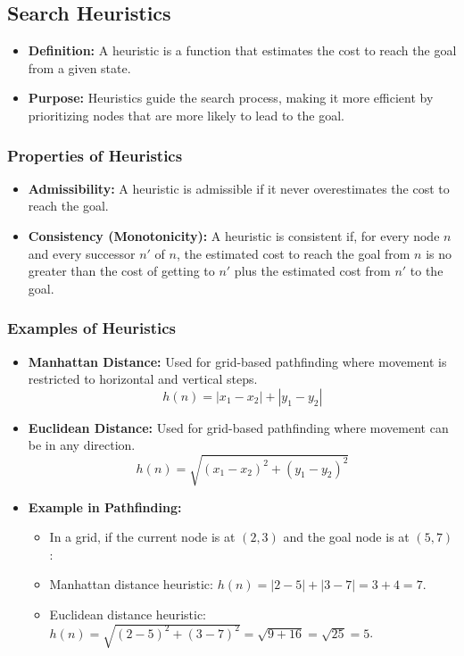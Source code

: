 \documentclass[8pt]{article}
\begin{document}
\subsection{Search Heuristics}
\begin{itemize}
    \item \textbf{Definition:} A heuristic is a function that estimates the cost to reach the goal from a given state.
    \item \textbf{Purpose:} Heuristics guide the search process, making it more efficient by prioritizing nodes that are more likely to lead to the goal.
\end{itemize}

\subsubsection*{Properties of Heuristics}
\begin{itemize}
    \item \textbf{Admissibility:} A heuristic is admissible if it never overestimates the cost to reach the goal.
    \item \textbf{Consistency (Monotonicity):} A heuristic is consistent if, for every node \(n\) and every successor \(n'\) of \(n\), the estimated cost to reach the goal from \(n\) is no greater than the cost of getting to \(n'\) plus the estimated cost from \(n'\) to the goal.
\end{itemize}

\subsubsection*{Examples of Heuristics}
\begin{itemize}
    \item \textbf{Manhattan Distance:} Used for grid-based pathfinding where movement is restricted to horizontal and vertical steps.
    \[
    h(n) = |x_1 - x_2| + |y_1 - y_2|
    \]
    \item \textbf{Euclidean Distance:} Used for grid-based pathfinding where movement can be in any direction.
    \[
    h(n) = \sqrt{(x_1 - x_2)^2 + (y_1 - y_2)^2}
    \]
    \item \textbf{Example in Pathfinding:} 
    \begin{itemize}
        \item In a grid, if the current node is at \((2, 3)\) and the goal node is at \((5, 7)\):
        \item Manhattan distance heuristic: \(h(n) = |2 - 5| + |3 - 7| = 3 + 4 = 7\).
        \item Euclidean distance heuristic: \(h(n) = \sqrt{(2 - 5)^2 + (3 - 7)^2} = \sqrt{9 + 16} = \sqrt{25} = 5\).
    \end{itemize}
\end{itemize}
\end{document}
